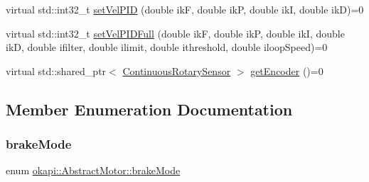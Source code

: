 \begin{DoxyCompactItemize}
\item 
virtual std\+::int32\+\_\+t \mbox{\hyperlink{classokapi_1_1AbstractMotor_a314a495f2d7cb1ffe157c9dbdf8963b9}{set\+Vel\+P\+ID}} (double ikF, double ikP, double ikI, double ikD)=0
\item 
virtual std\+::int32\+\_\+t \mbox{\hyperlink{classokapi_1_1AbstractMotor_afff15a595bb33454aabfac99248e8324}{set\+Vel\+P\+I\+D\+Full}} (double ikF, double ikP, double ikI, double ikD, double ifilter, double ilimit, double ithreshold, double iloop\+Speed)=0
\item 
virtual std\+::shared\+\_\+ptr$<$ \mbox{\hyperlink{classokapi_1_1ContinuousRotarySensor}{Continuous\+Rotary\+Sensor}} $>$ \mbox{\hyperlink{classokapi_1_1AbstractMotor_a87177280c20a855a74354dd8ba6e1d6a}{get\+Encoder}} ()=0
\end{DoxyCompactItemize}


\subsection{Member Enumeration Documentation}
\mbox{\label{classokapi_1_1AbstractMotor_a132e0485dbb59a60c3f934338d8fa601}} 
\subsubsection{\texorpdfstring{brakeMode}{brakeMode}}
{\footnotesize\ttfamily enum \mbox{\hyperlink{classokapi_1_1AbstractMotor_a132e0485dbb59a60c3f934338d8fa601}{okapi\+::\+Abstract\+Motor\+::brake\+Mode}}\hspace{0.3cm}{\ttfamily [strong]}}

